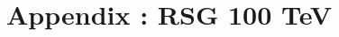 \documentclass{cernrep}
\begin{document}
\clearpage
\newpage

\section{Appendix : RSG 100 TeV}
\label{appendix:rsg100}

\end{document}
